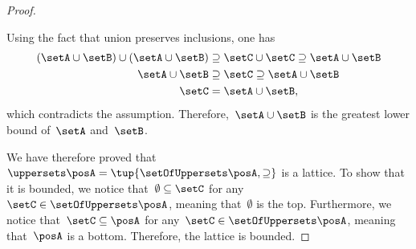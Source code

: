 \begin{proof}
\begin{compactitem}
        Using the fact that union preserves inclusions, one has
        \begin{equation}
            \begin{aligned}
                (\setA\cup \setB)
                \cup (\setA\cup \setB) & \supseteq \setC \cup \setC \supseteq \setA\cup \setB \\
                \setA\cup \setB        & \supseteq \setC\supseteq \setA\cup \setB             \\
                \setC                  & =\setA\cup \setB,                                    
            \end{aligned}
        \end{equation}
        which contradicts the assumption.
        Therefore,~$\setA\cup \setB$ is the greatest lower bound of~$\setA$ and~$\setB$.
    \end{compactitem}
    We have therefore proved that~$\uppersets \posA=\tup{\setOfUppersets \posA,\supseteq}$ is a lattice.
    To show that it is bounded, we notice that~$\emptyset \subseteq \setC$ for any~$\setC\in \setOfUppersets \posA$, meaning that~$\emptyset$ is the top.
    Furthermore, we notice that~$\setC\subseteq \posA$ for any~$\setC\in \setOfUppersets \posA$, meaning that~$\posA$ is a bottom.
    Therefore, the lattice is bounded.
\end{proof}

